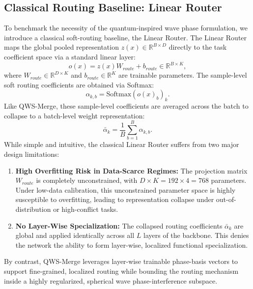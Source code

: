 \subsection{Classical Routing Baseline: Linear Router}
To benchmark the necessity of the quantum-inspired wave phase formulation, we introduce a classical soft-routing baseline, the Linear Router. The Linear Router maps the global pooled representation $z(x) \in \mathbb{R}^{B \times D}$ directly to the task coefficient space via a standard linear layer:
\begin{equation}
    o(x) = z(x) W_{route} + b_{route} \in \mathbb{R}^{B \times K},
\end{equation}
where $W_{route} \in \mathbb{R}^{D \times K}$ and $b_{route} \in \mathbb{R}^K$ are trainable parameters. The sample-level soft routing coefficients are obtained via Softmax:
\begin{equation}
    \alpha_{k, b} = \text{Softmax}(o(x)_b)_k.
\end{equation}
Like QWS-Merge, these sample-level coefficients are averaged across the batch to collapse to a batch-level weight representation:
\begin{equation}
    \bar{\alpha}_k = \frac{1}{B} \sum_{b=1}^B \alpha_{k, b}.
\end{equation}
While simple and intuitive, the classical Linear Router suffers from two major design limitations:
\begin{enumerate}
    \item \textbf{High Overfitting Risk in Data-Scarce Regimes:} The projection matrix $W_{route}$ is completely unconstrained, with $D \times K = 192 \times 4 = 768$ parameters. Under low-data calibration, this unconstrained parameter space is highly susceptible to overfitting, leading to representation collapse under out-of-distribution or high-conflict tasks.
    \item \textbf{No Layer-Wise Specialization:} The collapsed routing coefficients $\bar{\alpha}_k$ are global and applied identically across all $L$ layers of the backbone. This denies the network the ability to form layer-wise, localized functional specialization.
\end{enumerate}
By contrast, QWS-Merge leverages layer-wise trainable phase-basis vectors to support fine-grained, localized routing while bounding the routing mechanism inside a highly regularized, spherical wave phase-interference subspace.

